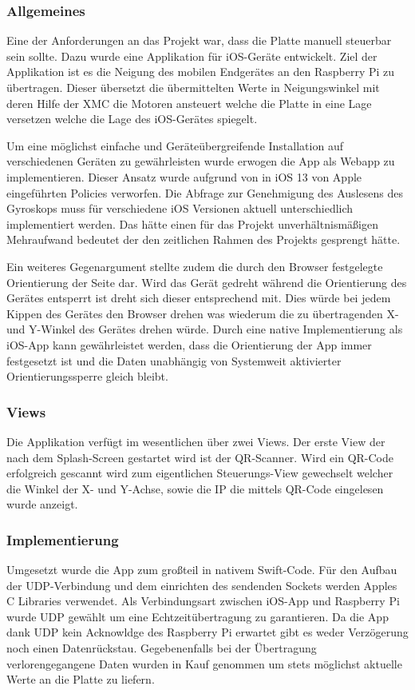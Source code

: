 \documentclass[12pt,a4paper,bibliography=totoc,listof=totoc]{scrartcl}
\begin{document}
\subsubsection{Allgemeines}
Eine der Anforderungen an das Projekt war, dass die Platte manuell steuerbar sein sollte. Dazu wurde eine Applikation für 
iOS-Geräte entwickelt. Ziel der Applikation ist es die Neigung des mobilen Endgerätes an den Raspberry Pi zu übertragen. 
Dieser übersetzt die übermittelten Werte in Neigungswinkel mit deren Hilfe der XMC die Motoren ansteuert welche die Platte 
in eine Lage versetzen welche die Lage des iOS-Gerätes spiegelt.

Um eine möglichst einfache und Geräteübergreifende Installation auf verschiedenen Geräten zu gewährleisten wurde erwogen die App 
als Webapp zu implementieren. Dieser Ansatz wurde aufgrund von in iOS 13 von Apple eingeführten Policies verworfen. Die Abfrage zur Genehmigung
des Auslesens des Gyroskops muss für verschiedene iOS Versionen aktuell unterschiedlich implementiert werden. Das hätte einen für das Projekt
unverhältnismäßigen Mehraufwand bedeutet der den zeitlichen Rahmen des Projekts gesprengt hätte. 

Ein weiteres Gegenargument stellte zudem die durch den Browser festgelegte Orientierung der Seite dar. 
Wird das Gerät gedreht während die Orientierung des Gerätes entsperrt ist dreht sich dieser entsprechend mit. 
Dies würde bei jedem Kippen des Gerätes den Browser drehen was wiederum die zu übertragenden X- und Y-Winkel des Gerätes drehen würde. 
Durch eine native Implementierung als iOS-App kann gewährleistet werden, dass die Orientierung der App immer festgesetzt ist und die Daten 
unabhängig von Systemweit aktivierter Orientierungssperre gleich bleibt.

\subsubsection{Views}
Die Applikation verfügt im wesentlichen über zwei Views. Der erste View der nach dem Splash-Screen gestartet wird ist der QR-Scanner. 
Wird ein QR-Code erfolgreich gescannt wird zum eigentlichen Steuerungs-View gewechselt welcher die Winkel der X- und Y-Achse, sowie 
die IP die mittels QR-Code eingelesen wurde anzeigt.

\subsubsection{Implementierung}
Umgesetzt wurde die App zum großteil in nativem Swift-Code. Für den Aufbau der UDP-Verbindung und dem einrichten des sendenden Sockets
werden Apples C Libraries verwendet. Als Verbindungsart zwischen iOS-App und Raspberry Pi wurde UDP gewählt um eine Echtzeitübertragung zu garantieren. 
Da die App dank UDP kein Acknowldge des Raspberry Pi erwartet gibt es weder Verzögerung noch einen Datenrückstau. Gegebenenfalls bei
der Übertragung verlorengegangene Daten wurden in Kauf genommen um stets möglichst aktuelle Werte an die Platte zu liefern. 
\end{document}
